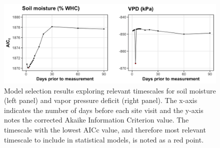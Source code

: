 \newpage
\begin{landscape}
    \begin{figure}
        \centering
        \includegraphics[width=\linewidth]{ch4_TXeco/figs/TXeco_figS2_aicc.jpg}
        \caption[Model selection results exploring relevant timescales for soil moisture and vapor pressure deficit]{Model selection results exploring relevant timescales for soil moisture (left panel) and vapor pressure deficit (right panel). The x-axis indicates the number of days before each site visit and the y-axis notes the corrected Akaike Information Criterion value. The timescale with the lowest AICc value, and therefore most relevant timescale to include in statistical models, is noted as a red point.}
        \label{fig:figure.c1}
    \end{figure}
\end{landscape}
\clearpage

